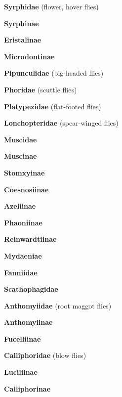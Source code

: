 \documentclass[letterpaper,10pt]{article}
\begin{document}
{\makebox[0.6cm]{}  \textbf{Syrphidae} (flower, hover flies) \par
\makebox[0.8cm]{}  \textbf{Syrphinae} \par
\makebox[0.8cm]{}  \textbf{Eristalinae} \par
\makebox[0.8cm]{}  \textbf{Microdontinae} \par
\makebox[0.6cm]{}  \textbf{Pipunculidae} (big-headed flies) \par
\makebox[0.6cm]{}  \textbf{Phoridae} (scuttle flies) \par
\makebox[0.6cm]{}  \textbf{Platypezidae} (flat-footed flies) \par
\makebox[0.6cm]{}  \textbf{Lonchopteridae} (spear-winged flies) \par
\makebox[0.6cm]{}  \textbf{Muscidae} \par
\makebox[0.8cm]{}  \textbf{Muscinae} \par
\makebox[0.8cm]{}  \textbf{Stomxyinae} \par
\makebox[0.8cm]{}  \textbf{Coesnosiinae} \par
\makebox[0.8cm]{}  \textbf{Azeliinae} \par
\makebox[0.8cm]{}  \textbf{Phaoniinae} \par
\makebox[0.8cm]{}  \textbf{Reinwardtiinae} \par
\makebox[0.8cm]{}  \textbf{Mydaeniae} \par
\makebox[0.6cm]{}  \textbf{Fanniidae} \par
\makebox[0.6cm]{}  \textbf{Scathophagidae} \par
\makebox[0.6cm]{}  \textbf{Anthomyiidae} (root maggot flies) \par
\makebox[0.8cm]{}  \textbf{Anthomyiinae} \par
\makebox[0.8cm]{}  \textbf{Fucelliinae} \par
\makebox[0.6cm]{}  \textbf{Calliphoridae} (blow flies) \par
\makebox[0.8cm]{}  \textbf{Luciliinae} \par
\makebox[0.8cm]{}  \textbf{Calliphorinae} \par
}
\end{document}
